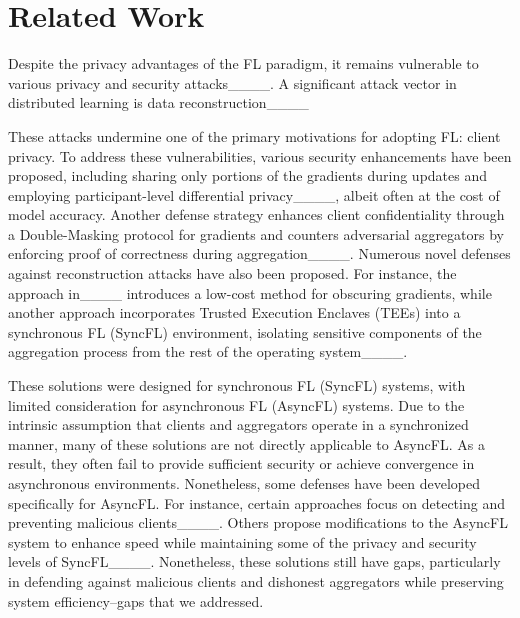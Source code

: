 \section{Related Work}
\label{sec02}
Despite the privacy advantages of the FL paradigm, it remains vulnerable to various privacy and security attacks____. A significant attack vector in distributed learning is data reconstruction____


These attacks undermine one of the primary motivations for adopting FL: client privacy. To address these vulnerabilities, various security enhancements have been proposed, including sharing only portions of the gradients during updates and employing participant-level differential privacy____, albeit often at the cost of model accuracy. Another defense strategy enhances client confidentiality through a Double-Masking protocol for gradients and counters adversarial aggregators by enforcing proof of correctness during aggregation____.
Numerous novel defenses against reconstruction attacks have also been proposed. For instance, the approach in____ introduces a low-cost method for obscuring gradients, while another approach incorporates Trusted Execution Enclaves (TEEs) into a synchronous FL (SyncFL) environment, isolating sensitive components of the aggregation process from the rest of the operating system____.


These solutions were designed for synchronous FL (SyncFL) systems, with limited consideration for asynchronous FL (AsyncFL) systems. Due to the intrinsic assumption that clients and aggregators operate in a synchronized manner, many of these solutions are not directly applicable to AsyncFL. As a result, they often fail to provide sufficient security or achieve convergence in asynchronous environments.
Nonetheless, some defenses have been developed specifically for AsyncFL. For instance, certain approaches focus on detecting and preventing malicious clients____. Others propose modifications to the AsyncFL system to enhance speed while maintaining some of the privacy and security levels of SyncFL____. Nonetheless, these solutions still have gaps, particularly in defending against malicious clients and dishonest aggregators while preserving system efficiency--gaps that we addressed.
